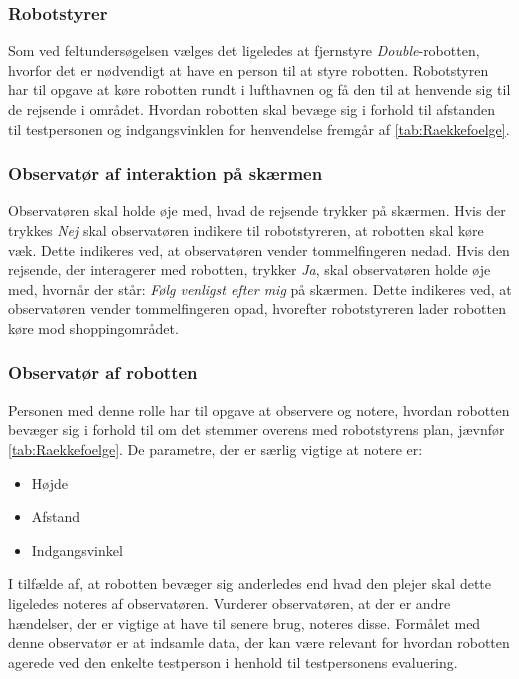\subsubsection*{Robotstyrer}
%
Som ved feltundersøgelsen vælges det ligeledes at fjernstyre \textit{Double}-robotten, hvorfor det er nødvendigt at have en person til at styre robotten. Robotstyren har til opgave at køre robotten rundt i lufthavnen og få den til at henvende sig til de rejsende i området. Hvordan robotten skal bevæge sig i forhold til afstanden til testpersonen og indgangsvinklen for henvendelse fremgår af \autoref{tab:Raekkefoelge}.

\subsubsection*{Observatør af interaktion på skærmen}
%
Observatøren skal holde øje med, hvad de rejsende trykker på skærmen. Hvis der trykkes \textit{Nej} skal observatøren indikere til robotstyreren, at robotten skal køre væk. Dette indikeres ved, at observatøren vender tommelfingeren nedad. Hvis den rejsende, der interagerer med robotten, trykker \textit{Ja}, skal observatøren holde øje med, hvornår der står: \textit{Følg venligst efter mig} på skærmen. Dette indikeres ved, at observatøren vender tommelfingeren opad, hvorefter robotstyreren lader robotten køre mod shoppingområdet. 

\subsubsection*{Observatør af robotten}
%
Personen med denne rolle har til opgave at observere og notere, hvordan robotten bevæger sig i forhold til om det stemmer overens med robotstyrens plan, jævnfør \autoref{tab:Raekkefoelge}. De parametre, der er særlig vigtige at notere er:\blankline 
%
\begin{itemize}
	\item Højde
	\item Afstand
	\item Indgangsvinkel\blankline
\end{itemize}
\noindent
%
I tilfælde af, at robotten bevæger sig anderledes end hvad den plejer skal dette ligeledes noteres af observatøren. Vurderer observatøren, at der er andre hændelser, der er vigtige at have til senere brug, noteres disse. Formålet med denne observatør er at indsamle data, der kan være relevant for hvordan robotten agerede ved den enkelte testperson i henhold til testpersonens evaluering.

